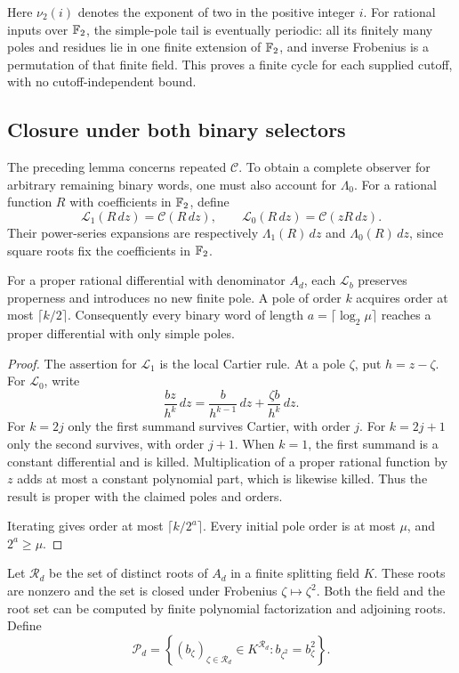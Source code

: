 Here $\nu_2(i)$ denotes the exponent of two in the positive integer
$i$. For rational inputs over $\mathbb F_2$, the simple-pole tail is
eventually periodic: all its finitely many poles and residues lie
in one finite extension of $\mathbb F_2$, and inverse Frobenius is a
permutation of that finite field. This proves a finite cycle for
each supplied cutoff, with no cutoff-independent bound.

\subsection{Closure under both binary selectors}

The preceding lemma concerns repeated $\mathcal C$. To obtain a
complete observer for arbitrary remaining binary words, one must
also account for $\Lambda_0$.
For a rational function $R$ with coefficients in $\mathbb F_2$, define
\[
 \mathcal L_1(R\,dz)=\mathcal C(R\,dz),\qquad
 \mathcal L_0(R\,dz)=\mathcal C(zR\,dz).
 \tag{L}
\]
Their power-series expansions are respectively
$\Lambda_1(R)\,dz$ and $\Lambda_0(R)\,dz$, since square roots
fix the coefficients in $\mathbb F_2$.

\begin{lemma}\label{lem:binary-transient}
For a proper rational differential with denominator $A_d$,
each $\mathcal L_b$ preserves properness and introduces no
new finite pole. A pole of order $k$ acquires order at most
$\lceil k/2\rceil$. Consequently every binary word of length
$a=\lceil\log_2\mu\rceil$ reaches a proper differential
with only simple poles.
\end{lemma}
\begin{proof}
The assertion for $\mathcal L_1$ is the local Cartier rule.
At a pole $\zeta$, put $h=z-\zeta$. For $\mathcal L_0$,
write
\[
 \frac{bz}{h^k}\,dz
 =\frac{b}{h^{k-1}}\,dz+\frac{\zeta b}{h^k}\,dz.
\]
For $k=2j$ only the first summand survives Cartier, with
order $j$. For $k=2j+1$ only the second survives, with
order $j+1$. When $k=1$, the first summand is a constant
differential and is killed. Multiplication of a proper
rational function by $z$ adds at most a constant
polynomial part, which is likewise killed. Thus the
result is proper with the claimed poles and orders.

Iterating gives order at most $\lceil k/2^a\rceil$.
Every initial pole order is at most $\mu$, and $2^a\ge\mu$.
\end{proof}

Let $\mathcal R_d$ be the set of distinct roots of $A_d$ in
a finite splitting field $K$. These roots are nonzero and
the set is closed under Frobenius $\zeta\mapsto\zeta^2$.
Both the field and the root set can be computed by finite
polynomial factorization and adjoining roots. Define
\[
 \mathcal P_d=
 \left\{(b_\zeta)_{\zeta\in\mathcal R_d}\in K^{\mathcal R_d}:
              b_{\zeta^2}=b_\zeta^2\right\}.
 \tag{P}
\]


